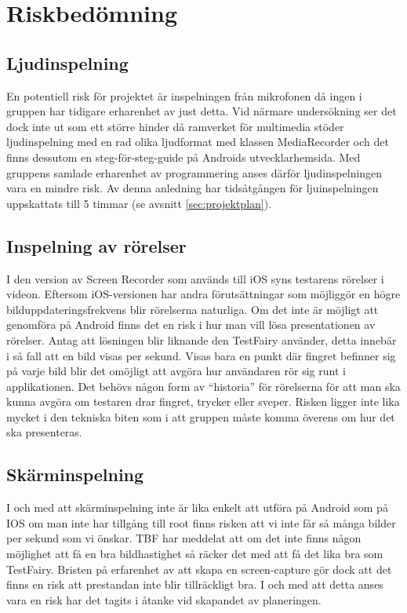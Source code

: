 \section{Riskbedömning}
\subsection{Ljudinspelning}
En potentiell risk för projektet är inspelningen från mikrofonen då ingen i gruppen har tidigare erharenhet av just detta. Vid närmare undersökning ser det dock inte ut som ett större hinder då ramverket för multimedia stöder ljudinspelning med en rad olika ljudformat med klassen MediaRecorder \parencite{sound} och det finns dessutom en steg-för-steg-guide på Androids utvecklarhemsida. Med gruppens samlade erharenhet av programmering anses därför ljudinspelningen vara en mindre risk. Av denna anledning har tidsåtgången för ljuinspelningen uppskattats till 5 timmar (se avsnitt \ref{sec:projektplan}).

\subsection{Inspelning av rörelser}
I den version av Screen Recorder som används till iOS syns testarens rörelser i videon. Eftersom iOS-versionen har andra förutsättningar som möjliggör en högre bilduppdateringsfrekvens blir rörelserna naturliga. Om det inte är möjligt att genomföra på Android finns det en risk i hur man vill lösa presentationen av rörelser. Antag att lösningen blir liknande den TestFairy använder, detta innebär i så fall att en bild visas per sekund. Visas bara en punkt där fingret befinner sig på varje bild blir det omöjligt att avgöra hur användaren rör sig runt i applikationen. Det behövs någon form av ``historia'' för rörelserna för att man ska kunna avgöra om testaren drar fingret, trycker eller sveper. Risken ligger inte lika mycket i den tekniska biten som i att gruppen måste komma överens om hur det ska presenteras.

\subsection{Skärminspelning}
I och med att skärminspelning inte är lika enkelt att utföra på Android som på IOS om man inte har tillgång till root finns risken att vi inte får så många bilder per sekund som vi önskar. TBF har meddelat att om det inte finns någon möjlighet att få en bra bildhastighet så räcker det med att få det lika bra som TestFairy. Bristen på erfarenhet av att skapa en screen-capture gör dock att det finns en risk att prestandan inte blir tillräckligt bra. I och med att detta anses vara en risk har det tagits i åtanke vid skapandet av planeringen.

